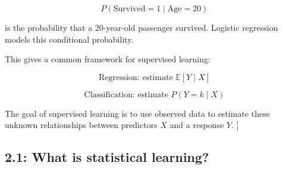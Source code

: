 \documentclass{article}
\begin{document}
\begin{enumerate}
\begin{enumerate}
$$
P(\text{Survived}=1\mid \text{Age}=20)
$$

is the probability that a 20-year-old passenger survived. Logistic regression models this conditional probability.

This gives a common framework for supervised learning:

$$
\boxed{\text{Regression: estimate }\mathbb{E}[Y\mid X]}
$$

$$
\boxed{\text{Classification: estimate }P(Y=k\mid X)}
$$

The goal of supervised learning is to use observed data to estimate these unknown relationships between predictors $X$ and a response $Y$.
]

\end{enumerate}


\end{enumerate}


\subsection*{2.1: What is statistical learning?}
\end{document}
